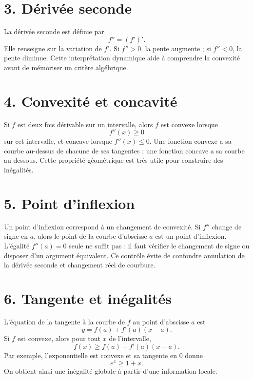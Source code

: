 
\section{3. Dérivée seconde}
La dérivée seconde est définie par
\[
f''=(f')'.
\]
Elle renseigne sur la variation de $f'$. Si $f''>0$, la pente augmente ; si $f''<0$, la pente diminue. Cette interprétation dynamique aide à comprendre la convexité avant de mémoriser un critère algébrique.

\section{4. Convexité et concavité}
Si $f$ est deux fois dérivable sur un intervalle, alors $f$ est convexe lorsque
\[
f''(x)\ge0
\]
sur cet intervalle, et concave lorsque $f''(x)\le0$. Une fonction convexe a sa courbe au-dessus de chacune de ses tangentes ; une fonction concave a sa courbe au-dessous. Cette propriété géométrique est très utile pour construire des inégalités.

\section{5. Point d’inflexion}
Un point d'inflexion correspond à un changement de convexité. Si $f''$ change de signe en $a$, alors le point de la courbe d'abscisse $a$ est un point d'inflexion. L'égalité $f''(a)=0$ seule ne suffit pas : il faut vérifier le changement de signe ou disposer d'un argument équivalent. Ce contrôle évite de confondre annulation de la dérivée seconde et changement réel de courbure.


\section{6. Tangente et inégalités}
L'équation de la tangente à la courbe de $f$ au point d'abscisse $a$ est
\[
y=f(a)+f'(a)(x-a).
\]
Si $f$ est convexe, alors pour tout $x$ de l'intervalle,
\[
f(x)\ge f(a)+f'(a)(x-a).
\]
Par exemple, l'exponentielle est convexe et sa tangente en $0$ donne
\[
e^x\ge1+x.
\]
On obtient ainsi une inégalité globale à partir d'une information locale.

